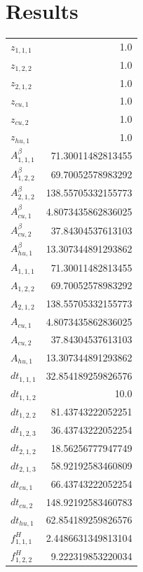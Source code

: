 \documentclass{article}%
\makeatletter
\let\mcnewpage=\newpage%
\newcommand{\TrickSupertabularIntoMulticols}{%
\renewcommand\newpage{%
\if@firstcolumn%
\hrule width\linewidth height0pt%
\columnbreak%
\else%
\mcnewpage%
\fi%
}%
}%
\makeatother
\begin{document}
\section{Results}%
\thispagestyle{plain}%
\begin{multicols*}{3}%
\TrickSupertabularIntoMulticols%
%
\begin{supertabular}{lr}%
	$z_{1,1,1}$ & 1.0 \\%
	$z_{1,2,2}$ & 1.0 \\%
	$z_{2,1,2}$ & 1.0 \\%
	$z_{cu,1}$ & 1.0 \\%
	$z_{cu,2}$ & 1.0 \\%
	$z_{hu,1}$ & 1.0 \\%
	$A_{1,1,1}^{\beta}$ & 71.30011482813455 \\%
	$A_{1,2,2}^{\beta}$ & 69.70052578983292 \\%
	$A_{2,1,2}^{\beta}$ & 138.55705332155773 \\%
	$A_{cu,1}^{\beta}$ & 4.8073435862836025 \\%
	$A_{cu,2}^{\beta}$ & 37.84304537613103 \\%
	$A_{hu,1}^{\beta}$ & 13.307344891293862 \\%
	$A_{1,1,1}$ & 71.30011482813455 \\%
	$A_{1,2,2}$ & 69.70052578983292 \\%
	$A_{2,1,2}$ & 138.55705332155773 \\%
	$A_{cu,1}$ & 4.8073435862836025 \\%
	$A_{cu,2}$ & 37.84304537613103 \\%
	$A_{hu,1}$ & 13.307344891293862 \\%
	$dt_{1,1,1}$ & 32.854189259826576 \\%
	$dt_{1,1,2}$ & 10.0 \\%
	$dt_{1,2,2}$ & 81.43743222052251 \\%
	$dt_{1,2,3}$ & 36.43743222052254 \\%
	$dt_{2,1,2}$ & 18.56256777947749 \\%
	$dt_{2,1,3}$ & 58.92192583460809 \\%
	$dt_{cu,1}$ & 66.43743222052254 \\%
	$dt_{cu,2}$ & 148.92192583460783 \\%
	$dt_{hu,1}$ & 62.854189259826576 \\%
	$f_{1,1,1}^{H}$ & 2.4486631349813104 \\%
	$f_{1,2,2}^{H}$ & 9.222319853220034 \\%

\end{supertabular}
\end{multicols*}
\end{document}
